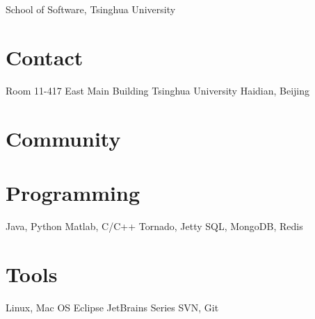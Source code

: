 \documentclass[]{friggeri-cv}
\begin{document}
       {School of Software, Tsinghua University}

\begin{aside}
  \section{Contact}
    Room 11-417
    East Main Building
    Tsinghua University
    Haidian, Beijing
  \section{Community}
  \section{Programming}
    Java, Python
    Matlab, C/C++
    Tornado, Jetty
    SQL, MongoDB, Redis
  \section{Tools}
    Linux, Mac OS
    Eclipse
    JetBrains Series
    SVN, Git
\end{aside}

\end{document}
